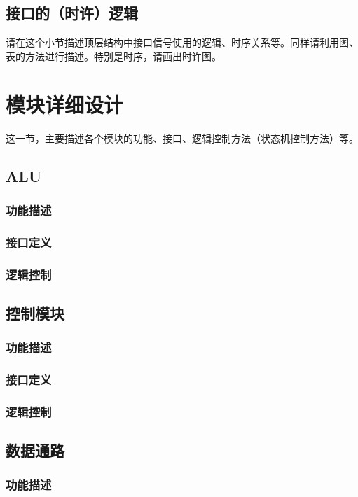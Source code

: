 \documentclass[UTF8]{article}
\begin{document}
\subsection{接口的（时许）逻辑}\label{sub:logicinter}
请在这个小节描述顶层结构中接口信号使用的逻辑、时序关系等。同样请利用图、表的方法进行描述。特别是时序，请画出时许图。
\section{模块详细设计}
这一节，主要描述各个模块的功能、接口、逻辑控制方法（状态机控制方法）等。
\subsection{ALU}\label{sub:alu}
\subsubsection{功能描述}
\subsubsection{接口定义}
\subsubsection{逻辑控制}

\subsection{控制模块}\label{sub:ctl}
\subsubsection{功能描述}
\subsubsection{接口定义}
\subsubsection{逻辑控制}

\subsection{数据通路}\label{sub:dat}
\subsubsection{功能描述}
\end{document}
